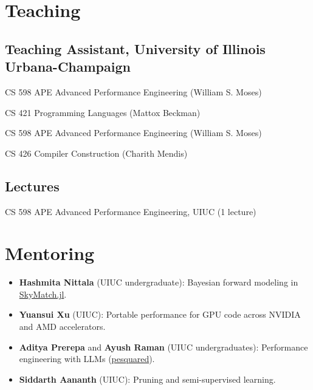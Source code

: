 \documentclass[11pt,letterpaper]{article}
\newenvironment{tagged}[1]{%
  \begin{description}[leftmargin=#1, labelwidth=\dimexpr#1-0.8em\relax,
    labelsep=0.8em, align=right, font=\normalfont, itemsep=1pt, topsep=1pt]}
  {\end{description}}
\begin{document}
\section{Teaching}
\subsection*{Teaching Assistant, University of Illinois Urbana-Champaign}
\begin{tagged}{7.6em}
  \item[Fall 2026]   CS 598 APE Advanced Performance Engineering (William S. Moses)
  \item[Spring 2026] CS 421 Programming Languages (Mattox Beckman)
  \item[Spring 2025] CS 598 APE Advanced Performance Engineering (William S. Moses)
  \item[Fall 2024]   CS 426 Compiler Construction (Charith Mendis)
\end{tagged}

\subsection*{Lectures}
\begin{tagged}{7.6em}
  \item[Fall 2026]   CS 598 APE Advanced Performance Engineering, UIUC (1 lecture)
\end{tagged}

\section{Mentoring}
\begin{itemize}[itemsep=1pt]
  \item \textbf{Hashmita Nittala} (UIUC undergraduate): Bayesian forward modeling in \href{https://github.com/PRONTOLab/SkyMatch.jl}{SkyMatch.jl}.
  \item \textbf{Yuansui Xu} (UIUC): Portable performance for GPU code across NVIDIA and AMD accelerators.
  \item \textbf{Aditya Prerepa} and \textbf{Ayush Raman} (UIUC undergraduates): Performance engineering with LLMs (\href{https://github.com/adiprerepa/pesquared}{pesquared}).
  \item \textbf{Siddarth Aananth} (UIUC): Pruning and semi-supervised learning.
\end{itemize}
\end{document}

